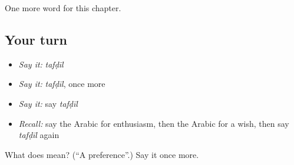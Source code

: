 \begin{grammarlens}[title={What you've built}]
One more word for this chapter.
\end{grammarlens}

\subsection*{Your turn}
\begin{itemize}
\raggedright
  \item \emph{Say it:} \emph{tafḍīl}
  \item \emph{Say it:} \emph{tafḍīl}, once more
  \item \emph{Say it:} say \emph{tafḍīl}
  \item \emph{Recall:} say the Arabic for enthusiasm, then the Arabic for a wish, then say \emph{tafḍīl} again
\end{itemize}

\begin{tcolorbox}[breakable,colback=teal!4,colframe=teal!35!black,title={Before you move on}]
What does  mean? (\textquotedblleft{}A preference\textquotedblright{}.) Say it once more.
\end{tcolorbox}
